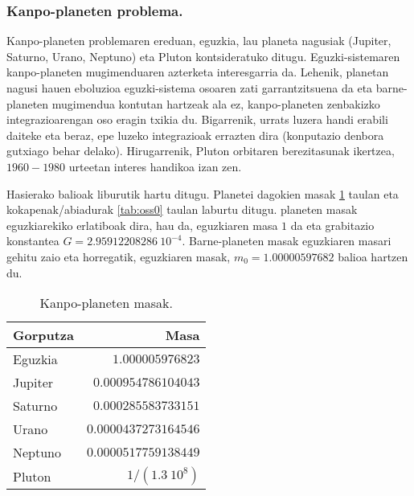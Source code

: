 \subsubsection*{Kanpo-planeten problema.}


Kanpo-planeten problemaren ereduan, eguzkia, lau planeta nagusiak (Jupiter, Saturno, Urano, Neptuno) eta Pluton kontsideratuko ditugu. Eguzki-sistemaren kanpo-planeten  mugimenduaren azterketa interesgarria da. Lehenik, planetan nagusi hauen eboluzioa eguzki-sistema osoaren zati garrantzitsuena da eta barne-planeten mugimendua kontutan hartzeak ala ez, kanpo-planeten zenbakizko integrazioarengan oso eragin txikia du. Bigarrenik, urrats luzera handi erabili daiteke eta beraz, epe luzeko integrazioak errazten dira (konputazio denbora gutxiago behar delako). Hirugarrenik, Pluton orbitaren berezitasunak ikertzea,  $1960-1980$ urteetan interes handikoa izan zen.        


Hasierako balioak \cite{Hairer2006} liburutik hartu ditugu. Planetei dagokien masak \ref{tab:ossm0} taulan eta kokapenak/abiadurak \ref{tab:oss0} taulan laburtu ditugu. planeten masak eguzkiarekiko erlatiboak dira, hau da, eguzkiaren masa $1$ da eta grabitazio konstantea $G=2.95912208286 \ 10^{-4}$. Barne-planeten masak eguzkiaren masari gehitu zaio eta horregatik, eguzkiaren masak, $m_0=1.00000597682$ balioa hartzen du.

\begin{table}[h]
\caption{Kanpo-planeten masak.}
\label{tab:ossm0}       %
\centering
\begin{tabular}{ l r }
\hline 
  Gorputza         &  Masa        
\\\hline
  Eguzkia          &  $1.000005976823$ \\
  Jupiter          &  $0.000954786104043$ \\
  Saturno          &  $0.000285583733151$ \\
  Urano            &  $0.0000437273164546$ \\
  Neptuno          &  $0.0000517759138449$ \\
  Pluton           &  ${1}/{(1.3 \ 10^8)}$ \\
\hline  
\end{tabular}
\end{table}

